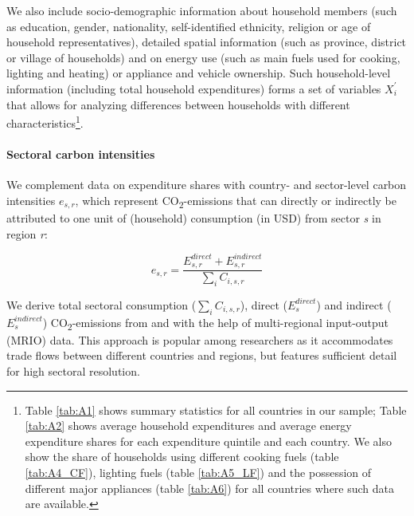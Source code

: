 \documentclass[12pt, a4paper]{article}
\begin{document}
We also include socio-demographic information about household members (such as education, gender, nationality, self-identified ethnicity, religion or age of household representatives), detailed spatial information (such as province, district or village of households) and on energy use (such as main fuels used for cooking, lighting and heating) or appliance and vehicle ownership. Such household-level information (including total household expenditures) forms a set of variables $X_{i}^{'}$ that allows for analyzing differences between households with different characteristics\footnote{Table \ref{tab:A1} shows summary statistics for all countries in our sample; Table \ref{tab:A2} shows average household expenditures and average energy expenditure shares for each expenditure quintile and each country. We also show the share of households using different cooking fuels (table \ref{tab:A4_CF}), lighting fuels (table \ref{tab:A5_LF}) and the possession of different major appliances (table \ref{tab:A6}) for all countries where such data are available.}.

\paragraph{Sectoral carbon intensities} We complement data on expenditure shares with country- and sector-level carbon intensities $e_{s,r}$, which represent CO\textsubscript{2}-emissions that can directly or indirectly be attributed to one unit of (household) consumption (in USD) from sector \textit{s} in region \textit{r}:

\begin{equation}
    e_{s,r} = \frac{E_{s,r}^{direct}+E_{s,r}^{indirect}}{\sum_{i} C_{i,s,r}}
\end{equation}

We derive total sectoral consumption ($\sum_{i} C_{i,s,r}$), direct ($E_{s}^{direct}$) and indirect ($E_{s}^{indirect}$) CO\textsubscript{2}-emissions from and with the help of multi-regional input-output (MRIO) data. This approach is popular among researchers as it accommodates trade flows between different countries and regions, but features sufficient detail for high sectoral resolution. 
\end{document}
